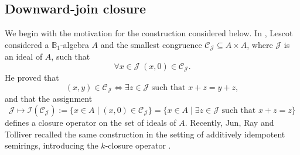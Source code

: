 \documentclass[10pt, reqno]{amsart}
\theoremstyle{plain}
\theoremstyle{definition}
\begin{document}
\subsection{Downward-join closure} 
We begin with the motivation for the construction considered below. In \cite[Theorem 3.7]{LESCOT20111782}, Lescot considered a $\mathbb{B}_1$-algebra $A$ and the smallest congruence $\mathcal{C}_\mathcal{J} \subseteq A \times A$, where $\mathcal{J}$ is an ideal of $A$, such that $$\forall x \in \mathcal{J} \hspace{3pt} (x, 0) \in \mathcal{C}_\mathcal{J}.$$ He proved that $$(x, y)\in\mathcal{C}_\mathcal{J} \iff \exists z \in \mathcal{J} \text{ such that } x + z = y + z,$$ and that the assignment $$\mathcal{J} \mapsto \mathcal{I}(\mathcal{C}_\mathcal{J}) := \{x \in A \mid (x, 0)\in\mathcal{C}_\mathcal{J}\} = \{x\in A \mid \exists z\in \mathcal{J} \text{ such that } x + z = z\}$$ defines a closure operator on the set of ideals of $A$. Recently, Jun, Ray and Tolliver recalled the same construction in the setting of additively idempotent semirings, introducing the $k$-closure operator \cite[Section 5]{JunRayTolliver}. 
\end{document}
